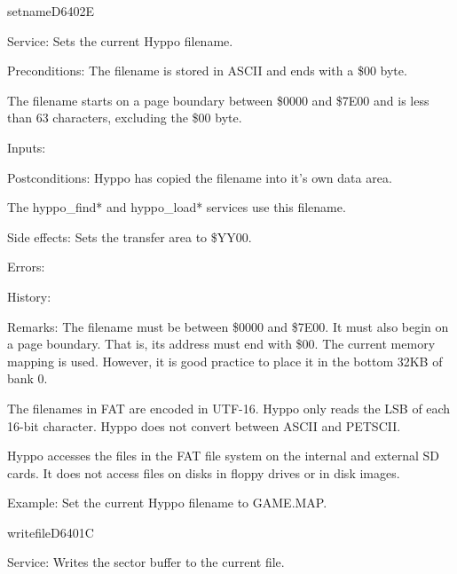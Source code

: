 \newpage
\begin{hyppotrap}{setname}{D640}{2E}
\item [Service:]
  Sets the current Hyppo filename.
\item [Preconditions:]
  The filename is stored in ASCII and ends with a \$00 byte.

  The filename starts on a page boundary between \$0000 and \$7E00 and is less
  than 63 characters, excluding the \$00 byte.
\item [Inputs:]
\item [Postconditions:]
  Hyppo has copied the filename into it's own data area.

  The hyppo\_find* and hyppo\_load* services use this filename.
\item [Side effects:]
  Sets the transfer area to \$YY00.
\item [Errors:]
\item [History:]
\item [Remarks:]
  The filename must be between \$0000 and \$7E00. It must also begin on a
  page boundary. That is, its address must end with \$00. The current memory
  mapping is used. However, it is good practice to place it in the bottom 32KB
  of bank 0.

  The filenames in FAT are encoded in UTF-16. Hyppo only reads the LSB
  of each 16-bit character. Hyppo does not convert between ASCII and
  PETSCII.

  Hyppo accesses the files in the FAT file system on the internal and
  external SD cards. It does not access files on disks in floppy drives or in
  disk images.
\item [Example:]
  Set the current Hyppo filename to GAME.MAP.
\end{hyppotrap}


\newpage
\begin{hyppotrap}{writefile}{D640}{1C}
\item [Service:]
  Writes the sector buffer to the current file.
\notimplemented
\end{hyppotrap}



